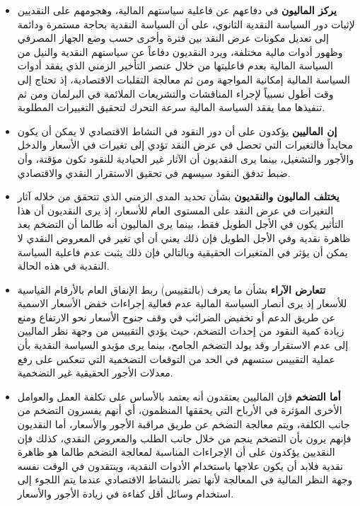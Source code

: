 \documentclass[10pt,a4paper]{report}
\begin{document}
\begin{doublespacing}
\begin{itemize}
	\item \textbf{يركز الماليون} في دفاعهم عن فاعلية سياستهم المالية، وهجومهم على النقديين لإثبات دور السياسة النقدية الثانوي، على أن السياسة النقدية بحاجة مستمرة ودائمة إلى تعديل مكونات عرض النقد بين فترة وأخرى حسب وضع الجهاز المصرفي وظهور أدوات مالية مختلفة، ويرد النقديون دفاعاً عن سياستهم النقدية والنيل من السياسة المالية بعدم فاعليتها من خلال عنصر التأخير الزمني الذي يفقد أدوات السياسة المالية إمكانية المواجهة ومن ثم معالجة التقلبات الاقتصادية، إذ تحتاج إلى وقت أطول نسبياً لإجراء المناقشات والتشريعات الملائمة في البرلمان ومن ثم تنفيذها مما يفقد السياسة المالية سرعة التحرك لتحقيق التغييرات المطلوبة.
	\item \textbf{إن الماليين} يؤكدون على أن دور النقود في النشاط الاقتصادي لا يمكن أن يكون محايداً فالتغيرات التي تحصل في عرض النقد تؤدي إلى تغيرات في الأسعار والدخل والأجور والتشغيل، بينما يرى النقديون أن الآثار غير الحيادية للنقود تكون مؤقتة، وأن ضبط تدفق النقود سيسهم في تحقيق الاستقرار النقدي والاقتصادي.
	\item \textbf{يختلف الماليون والنقديون} بشأن تحديد المدى الزمني الذي تتحقق من خلاله آثار التغيرات في عرض النقد على المستوى العام للأسعار، إذ يرى النقديون أن هذا التأثير يكون في الأجل الطويل فقط، بينما يرى الماليون أنه طالما أن التضخم يعد ظاهرة نقدية وفي الأجل الطويل فإن ذلك يعني أن أي تغير في المعروض النقدي لا يمكن أن يؤثر في المتغيرات الحقيقية وبالتالي فإن ذلك يثبت عدم فاعلية السياسة النقدية في هذه الحالة.
	\item \textbf{تتعارض الآراء} بشأن ما يعرف (بالتقييس) ربط الإنفاق العام بالأرقام القياسية للأسعار إذ يرى أنصار السياسة المالية عدم فعالية إجراءات خفض الأسعار الاسمية عن طريق الدعم أو تخفيض الضرائب في وقف جنوح الأسعار نحو الارتفاع ومنع زيادة كمية النقود من إحداث التضخم، حيث يؤدي التقييس من وجهة نظر الماليين إلى عدم الاستقرار وقد يولد التضخم الجامح، بينما يرى مؤيدو السياسة النقدية بأن عملية التقييس ستسهم في الحد من التوقعات التضخمية التي تنعكس على رفع معدلات الأجور الحقيقية غير التضخمية.
	\item \textbf{أما التضخم} فإن الماليين يعتقدون أنه يعتمد بالأساس على تكلفة العمل والعوامل الأخرى المؤثرة في الأرباح التي يحققها المنظمون، أي أنهم يفسرون التضخم من جانب الكلفة، ويتم معالجة التضخم عن طريق مراقبة الأجور والأسعار، أما النقديون فإنهم يرون بأن التضخم ينجم من خلال جانب الطلب والمعروض النقدي، كذلك فإن النقديين يؤكدون على أن الإجراءات المناسبة لمعالجة التضخم طالما هو ظاهرة نقدية فلابد أن يكون علاجها باستخدام الأدوات النقدية، وينتقدون في الوقت نفسه وجهة النظر المالية في المعالجة لأنها تضر بالنشاط الاقتصادي عندما يتم اللجوء إلى استخدام وسائل أقل كفاءة في زيادة الأجور والأسعار.

\end{itemize}
\end{doublespacing}
\end{document}
